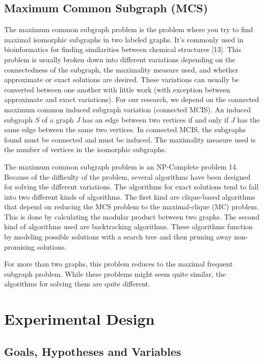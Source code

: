 \documentclass[conference,compsoc]{IEEEtran}
\begin{document}
\hypertarget{maximum-common-subgraph-mcs}{%
\subsection{Maximum Common Subgraph
(MCS)}\label{maximum-common-subgraph-mcs}}

The maximum common subgraph problem is the problem where you try to find
maximal isomorphic subgraphs in two labeled graphs. It's commonly used
in bioinformatics for finding similarities between chemical structures
{[}13{]}. This problem is usually broken down into different variations
depending on the connectedness of the subgraph, the maximality measure
used, and whether approximate or exact solutions are desired. These
variations can usually be converted between one another with little work
(with exception between approximate and exact variations). For our
research, we depend on the connected maximum common induced subgraph
variation (connected MCIS). An induced subgraph \(S\) of a graph \(J\)
has an edge between two vertices if and only if \(J\) has the same edge
between the same two vertices. In connected MCIS, the subgraphs found
must be connected and must be induced. The maximality measure used is
the number of vertices in the isomorphic subgraphs.

The maximum common subgraph problem is an NP-Complete problem 14.
Because of the difficulty of the problem, several algorithms have been
designed for solving the different variations. The algorithms for exact
solutions tend to fall into two different kinds of algorithms. The first
kind are clique-based algorithms that depend on reducing the MCS problem
to the maximal-clique (MC) problem. This is done by calculating the
modular product between two graphs. The second kind of algorithms used
are backtracking algorithms. These algorithms function by modeling
possible solutions with a search tree and then pruning away
non-promising solutions.

For more than two graphs, this problem reduces to the maximal frequent
subgraph problem. While these problems might seem quite similar, the
algorithms for solving them are quite different.

\hypertarget{experimental-design}{%
\section{Experimental Design}\label{experimental-design}}

\hypertarget{goals-hypotheses-and-variables}{%
\subsection{Goals, Hypotheses and
Variables}\label{goals-hypotheses-and-variables}}
\end{document}
